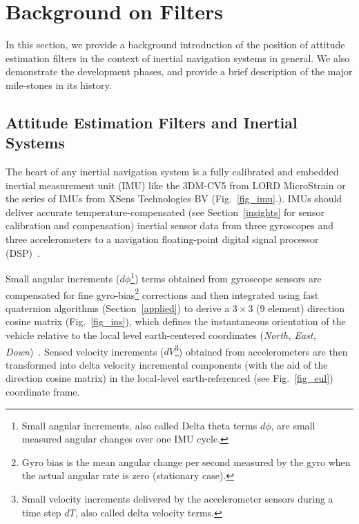 \documentclass[journal]{IEEEtran}
\begin{document}
\section{Background on Filters}\label{background}
In this section, we provide a background introduction of the position of attitude estimation filters in the context of inertial navigation systems in general.   We also demonstrate the development phases, and provide a brief description of the major mile-stones in its history.


\subsection{Attitude Estimation Filters and Inertial Systems}
The heart of any inertial navigation system is a fully calibrated and embedded inertial measurement unit (IMU) like the 3DM-CV5 from LORD MicroStrain or the series of IMUs from XSens Technologies BV (Fig.~\ref{fig_imu}.). IMUs should deliver accurate temperature-compensated (see Section~\ref{insights} for sensor calibration and compensation) inertial sensor data from three gyroscopes and three accelerometers to a navigation floating-point digital signal processor (DSP)~\cite{nguyen2012loosely,wang2006quadratic}. 

Small angular increments ($d\phi $\footnote{Small angular increments, also called Delta theta terms $d\phi$, are small measured angular changes over one IMU cycle.\label{dtheta}}) terms obtained from   gyroscope sensors  are compensated for fine gyro-bias\footnote{Gyro bias is the mean angular change per second measured by the gyro when the actual angular rate is zero (stationary case).} corrections and then integrated using fast quaternion algorithms (Section~\ref{applied}) to derive a $3\times3$ ($9$ element) direction cosine matrix (Fig.~\ref{fig_ins}), which defines the instantaneous orientation of the vehicle relative to the local level earth-centered coordinates (\textit{North, East, Down})~\cite{wang2018gnss,jiang2016novel}. Sensed velocity increments ($dV $\footnote{Small velocity increments delivered by the accelerometer sensors during a  time step $dT$, also called delta velocity terms.}) obtained from  accelerometers are then transformed into delta velocity incremental components (with the aid of the direction cosine matrix) in the local-level earth-referenced (see Fig.~\ref{fig_eul}) coordinate frame. 
\end{document}
